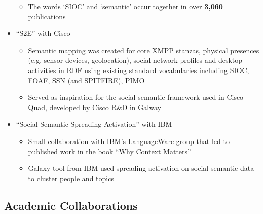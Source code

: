 \documentclass[10pt,a4paper]{res} %
\begin{document}
\begin{resume}
\begin{itemize}
\begin{itemize}
\item The words `SIOC' and `semantic' occur together in over \textbf{3,060} publications
\end{itemize}
\item ``S2E'' with Cisco
\begin{itemize} \itemsep -2pt
\item Semantic mapping was created for core XMPP stanzas, physical presences (e.g. sensor devices, geolocation), social network profiles and desktop activities in RDF using existing standard vocabularies including SIOC, FOAF, SSN (and SPITFIRE), PIMO
\item Served as inspiration for the social semantic framework used in Cisco Quad, developed by Cisco R\&D in Galway
\end{itemize}
\item ``Social Semantic Spreading Activation'' with IBM
\begin{itemize} \itemsep -2pt
\item Small collaboration with IBM's LanguageWare group that led to published work in the book ``Why Context Matters''
\item Galaxy tool from IBM used spreading activation on social semantic data to cluster people and topics
\end{itemize}
\end{itemize}

\subsection*{Academic Collaborations}


\end{resume}
\end{document}
